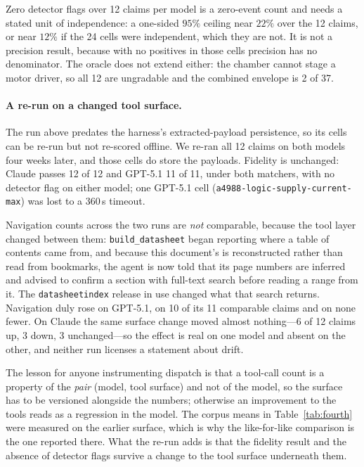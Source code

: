 \documentclass[11pt]{article}
\begin{document}
Zero detector flags over 12 claims per model is a zero-event count and
needs a stated unit of independence: a one-sided $95\%$ ceiling near
$22\%$ over the 12 claims, or near $12\%$ if the 24 cells were
independent, which they are not. It is not a precision result, because
with no positives in those cells precision has no denominator. The
oracle does not extend either: the chamber cannot stage a motor driver,
so all 12 are ungradable and the combined envelope is 2 of 37.

\paragraph{A re-run on a changed tool surface.}
The run above predates the harness's extracted-payload persistence, so
its cells can be re-run but not re-scored offline. We re-ran all 12
claims on both models four weeks later, and those cells do store the
payloads. Fidelity is unchanged: Claude passes 12 of 12 and GPT-5.1
11 of 11, under both matchers, with no detector flag on either model;
one GPT-5.1 cell (\texttt{a4988-logic-supply-current-max}) was lost to a
360\,s timeout.

Navigation counts across the two runs are \emph{not} comparable,
because the tool layer changed between them: \texttt{build\_datasheet}
began reporting where a table of contents came from, and because this
document's is reconstructed rather than read from bookmarks, the agent
is now told that its page numbers are inferred and advised to confirm a
section with full-text search before reading a range from it. The
\texttt{datasheetindex} release in use changed what that search
returns. Navigation duly rose
on GPT-5.1, on 10 of its 11 comparable claims and on none fewer. On
Claude the same surface change moved almost nothing---6 of 12 claims up,
3 down, 3 unchanged---so the effect is real on one model and absent on
the other, and neither run licenses a statement about drift.

The lesson for anyone instrumenting dispatch is that a tool-call count
is a property of the \emph{pair} (model, tool surface) and not of the
model, so the surface has to be versioned alongside the numbers;
otherwise an improvement to the tools reads as a regression in the
model. The corpus means in Table~\ref{tab:fourth} were measured on the
earlier surface, which is why the like-for-like comparison is the one
reported there. What the re-run adds is that the fidelity result and
the absence of detector flags survive a change to the tool surface
underneath them.
\end{document}
